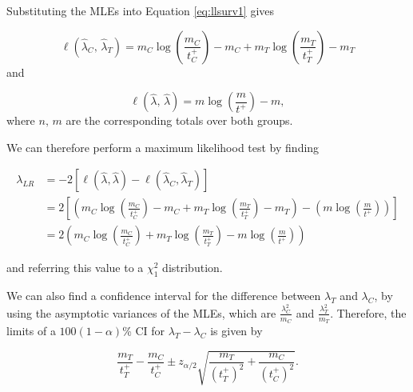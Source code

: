 \documentclass[
  openany]{book}
\theoremstyle{definition}
\theoremstyle{definition}
\theoremstyle{definition}
\theoremstyle{definition}
\theoremstyle{remark}
\begin{document}
Substituting the MLEs into Equation \eqref{eq:llsurv1} gives

\[\ell\left(\hat{\lambda}_C,\,\hat{\lambda}_T\right) = m_C\log\left(\frac{m_C}{t^+_C}\right) - m_C + m_T\log\left(\frac{m_T}{t^+_T}\right) - m_T  \]
and

\[\ell\left(\hat\lambda,\,\hat\lambda\right) = m\log\left(\frac{m}{t^+}\right) - m,\]
where \(n,\,m\) are the corresponding totals over both groups.

We can therefore perform a maximum likelihood test by finding

\begin{align*}
\lambda_{LR}&  = -2\left[\ell\left(\hat{\lambda},\hat{\lambda}\right) - \ell\left(\hat{\lambda}_C,\hat{\lambda}_T\right)\right] \\
& = 2\left[\left(m_C\log\left(\frac{m_C}{t^+_C}\right) - m_C + m_T\log\left(\frac{m_T}{t^+_T}\right) - m_T \right) - \left(m\log\left(\frac{m}{t^+}\right)\right)\right]\\
& = 2\left(m_C\log\left(\frac{m_C}{t^+_C}\right) + m_T\log\left(\frac{m_T}{t^+_T}\right) - m\log\left(\frac{m}{t^+}\right)\right)
\end{align*}

and referring this value to a \(\chi^2_1\) distribution.

We can also find a confidence interval for the difference between \(\lambda_T\) and \(\lambda_C\), by using the asymptotic variances of the MLEs, which are \(\frac{\lambda_C^2}{m_C}\) and \(\frac{\lambda_T^2}{m_T}\). Therefore, the limits of a \(100\left(1-\alpha\right)\)\% CI for \(\lambda_T - \lambda_C\) is given by

\[ \frac{m_T}{t^+_T} - \frac{m_C}{t^+_C} \pm z_{\alpha/2}\sqrt{\frac{m_T}{\left(t^+_T\right)^2} + \frac{m_C}{\left(t^+_C\right)^2}}.\]
\end{document}
